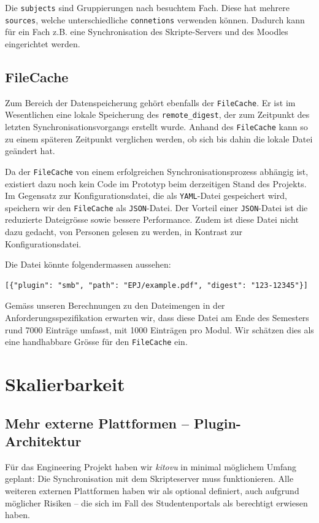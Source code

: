 \documentclass[a4paper]{article}
\let\oldsection\section
\renewcommand\section{\clearpage\oldsection}
\begin{document}
Die \verb|subjects| sind Gruppierungen nach besuchtem Fach.
Diese hat mehrere \verb|sources|, welche unterschiedliche \verb|connetions| verwenden können.
Dadurch kann für ein Fach z.B. eine Synchronisation des Skripte-Servers und des Moodles eingerichtet werden.

\subsection{FileCache}

Zum Bereich der Datenspeicherung gehört ebenfalls der \verb|FileCache|. Er ist im Wesentlichen eine lokale Speicherung des \verb|remote_digest|, der zum Zeitpunkt des letzten Synchronisationsvorgangs erstellt wurde. Anhand des \verb|FileCache| kann so zu einem späteren Zeitpunkt verglichen werden, ob sich bis dahin die lokale Datei geändert hat.

Da der \verb|FileCache| von einem erfolgreichen Synchronisationsprozess abhängig ist, existiert dazu noch kein Code im Prototyp beim derzeitigen Stand des Projekts. Im Gegensatz zur Konfigurationsdatei, die als \verb|YAML|-Datei gespeichert wird, speichern wir den \verb|FileCache| als \verb|JSON|-Datei. Der Vorteil einer \verb|JSON|-Datei ist die reduzierte Dateigrösse sowie bessere Performance. Zudem ist diese Datei nicht dazu gedacht, von Personen gelesen zu werden, in Kontrast zur Konfigurationsdatei.

Die Datei könnte folgendermassen aussehen:

\begin{verbatim}
[{"plugin": "smb", "path": "EPJ/example.pdf", "digest": "123-12345"}]
\end{verbatim}

Gemäss unseren Berechnungen zu den Dateimengen in der Anforderungsspezifikation erwarten wir, dass diese Datei am Ende des Semesters rund 7000 Einträge umfasst, mit 1000 Einträgen pro Modul. Wir schätzen dies als eine handhabbare Grösse für den \verb|FileCache| ein.

\section{Skalierbarkeit}

\subsection{Mehr externe Plattformen -- Plugin-Architektur}

Für das Engineering Projekt haben wir \emph{kitovu} in minimal möglichem Umfang geplant: Die Synchronisation mit dem Skripteserver muss funktionieren. Alle weiteren externen Plattformen haben wir als optional definiert, auch aufgrund möglicher Risiken -- die sich im Fall des Studentenportals als berechtigt erwiesen haben.
\end{document}
